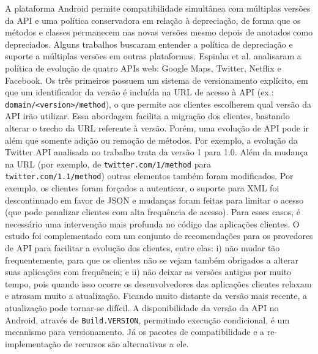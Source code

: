 A plataforma Android permite compatibilidade simultânea com múltiplas versões
da API e uma política conservadora em relação à depreciação, de forma que os
métodos e classes permanecem nas novas versões mesmo depois de anotados como
depreciados. Alguns trabalhos buscaram entender a política de depreciação e
suporte a múltiplas versões em outras plataformas. Espinha et al. \cite{Espinha2014}
analisaram a política de evolução de quatro APIs web: Google Maps, Twitter, 
Netflix e Facebook. Os três primeiros possuem um sistema de versionamento
explícito, em que um identificador da versão é incluída na URL de acesso à API
(ex.: \texttt{domain/<version>/method}), o que permite aos clientes escolherem qual
versão da API irão utilizar. Essa abordagem facilita a migração dos clientes, bastando
alterar o trecho da URL referente à versão. Porém, uma evolução de API pode ir além que
somente adição ou remoção de métodos. Por exemplo, a evolução da Twitter API analisada
no trabalho trata da versão 1 para 1.0. Além da mudança na URL (por exemplo, de
\texttt{twitter.com/1/method} para \texttt{twitter.com/1.1/method}) outras elementos
também foram modificados. Por exemplo, os clientes foram forçados a autenticar,
o suporte para XML foi descontinuado em favor de JSON e mudanças foram feitas para limitar
o acesso (que pode penalizar clientes com alta frequência de acesso). Para esses casos,
é necessário uma intervenção mais profunda no código das aplicações clientes. O estudo
foi complementado com um conjunto de recomendações para os provedores de API para
facilitar a evolução dos clientes, entre elas: i) não mudar tão frequentemente, para
que os clientes não se vejam também obrigados a alterar suas aplicações com frequência;
e ii) não deixar as versões antigas por muito tempo, pois quando  isso ocorre os
desenvolvedores das aplicações clientes relaxam e atrasam muito a atualização.
Ficando muito distante da versão mais recente, a atualização pode tornar-se difícil.
A disponibilidade da versão da API no Android, através de \texttt{Build.VERSION},
permitindo execução condicional, é um mecanismo para versionamento. Já os pacotes
de compatibilidade e a re-implementação de recursos são alternativas a ele.

